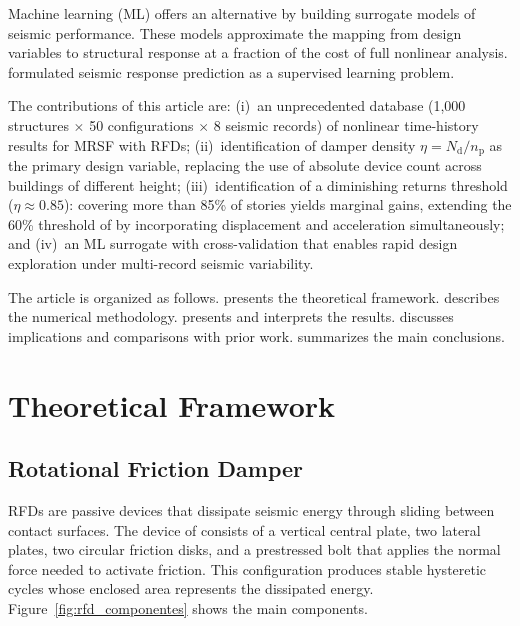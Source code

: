 \documentclass[preprint,12pt,authoryear]{elsarticle}
\newcommand{\nd}{N_{\mathrm{d}}}
\newcommand{\np}{n_{\mathrm{p}}}              %
\newcommand{\etad}{\eta}
\begin{document}
Machine learning (ML) offers an alternative by building surrogate models of seismic
performance. These models approximate the mapping from design variables to structural
response at a fraction of the cost of full nonlinear analysis. \citet{Kazemi2022}
formulated seismic response prediction as a supervised learning problem.

The contributions of this article are: (i)~an unprecedented database (1,000
structures $\times$ 50 configurations $\times$ 8 seismic records) of nonlinear
time-history results for MRSF with RFDs; (ii)~identification of damper density
$\etad = \nd/\np$ as the primary design variable, replacing the use of absolute
device count across buildings of different height; (iii)~identification of a
diminishing returns threshold ($\etad \approx 0.85$): covering more than 85\% of
stories yields marginal gains, extending the 60\% threshold of \citet{Jarrahi2020sdee}
by incorporating displacement and acceleration simultaneously; and (iv)~an ML
surrogate with cross-validation that enables rapid design exploration under
multi-record seismic variability.

The article is organized as follows.  presents the theoretical
framework.  describes the numerical methodology. 
presents and interprets the results.  discusses implications and
comparisons with prior work.  summarizes the main conclusions.

\section{Theoretical Framework}
\label{sec:theory}

\subsection{Rotational Friction Damper}
\label{sec:theory:afr}

RFDs are passive devices that dissipate seismic energy through sliding between
contact surfaces. The device of \citet{Mualla2002} consists of a vertical central
plate, two lateral plates, two circular friction disks, and a prestressed bolt that
applies the normal force needed to activate friction. This configuration produces
stable hysteretic cycles whose enclosed area represents the dissipated energy.
Figure~\ref{fig:rfd_componentes} shows the main components.
\end{document}
